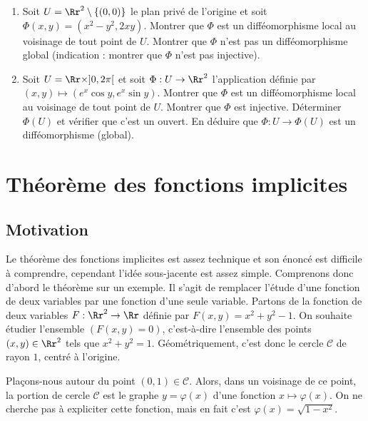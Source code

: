 \documentclass[11pt, class=report,crop=false]{standalone}
\begin{document}
\begin{miniexercices}
\sauteligne
\begin{enumerate}
  \item Soit $U = \Rr^2 \setminus \{ (0,0) \}$ le plan privé de l'origine et soit $\Phi(x,y)=(x^2-y^2,2xy)$.  
  Montrer que $\Phi$ est un difféomorphisme local au voisinage de
  tout point de $U$. Montrer que $\Phi$ n'est pas un difféomorphisme global (indication : montrer que $\Phi$ n'est pas injective).
  
  \item Soit $U = \Rr \times ]0,2\pi[$
  et soit $\Phi : U \to \Rr^2$ l'application définie
  par $(x,y) \mapsto (e^x\cos y,e^x\sin y)$.
  Montrer que $\Phi$ est un difféomorphisme local au voisinage de
  tout point de $U$.  Montrer que $\Phi$ est injective. Déterminer $\Phi(U)$ et vérifier que c'est un ouvert. En déduire que $\Phi : U \to \Phi(U)$ est un difféomorphisme (global).
\end{enumerate}
\end{miniexercices}




\section{Théorème des fonctions implicites}

\subsection{Motivation}

Le théorème des fonctions implicites est assez technique et son énoncé est difficile à comprendre, cependant l'idée  sous-jacente est assez simple.
Comprenons donc d'abord le théorème sur un exemple.
Il s'agit de remplacer l'étude d'une fonction de deux variables par une fonction d'une seule variable.
Partons de la fonction de deux variables $F : \Rr^2 \to \Rr$ définie par $F(x,y) = x^2+y^2-1$.
On souhaite étudier l'ensemble $(F(x,y)=0)$, c'est-à-dire l'ensemble des points $(x,y) \in \Rr^2$ tels que $x^2+y^2=1$.
Géométriquement, c'est donc le cercle $\mathcal{C}$ de rayon $1$, centré à l'origine.



\bigskip

Plaçons-nous autour du point $(0,1) \in \mathcal{C}$. Alors, dans un voisinage de ce point, la portion de cercle $\mathcal{C}$ est le graphe $y = \varphi(x)$ d'une fonction $x \mapsto \varphi(x)$. On ne cherche pas à expliciter cette fonction, mais en fait c'est $\varphi(x) = \sqrt{1-x^2}$.
\end{document}
